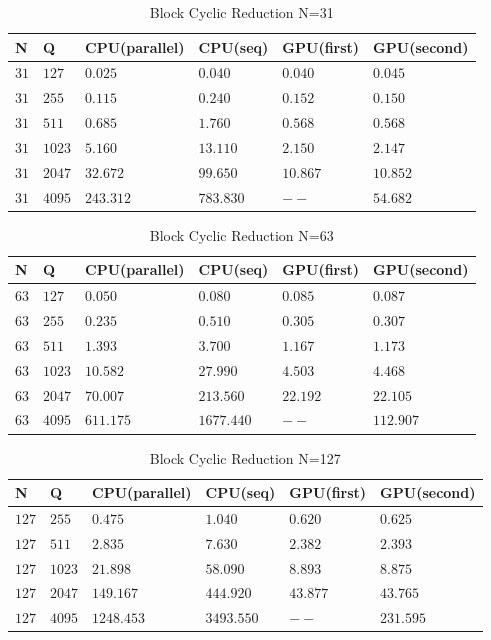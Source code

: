    \begin{table}[H]
\caption{Block Cyclic Reduction N=31} 
\centering 
\begin{tabular}{| l |  p{1cm} |p{}| p{} |  p{}| p{} | } 
\hline\hline 
N & Q & CPU(parallel) & CPU(seq) & GPU(first)  & GPU(second) \\ [0.8ex] 
\hline
$31$ &	$127$ & $0.025$	&	$0.040$ & $0.040$ & $0.045$ \\
$31$ &	$255$ & $0.115$	&	$0.240$ & $0.152$ & $0.150$ \\
$31$ &	$511$ & $0.685$	&	$1.760$ & $0.568$ & $0.568$ \\
$31$ &	$1023$ & $5.160$	& $13.110$ & $2.150$ & $2.147$ \\
$31$ &	$2047$ & $32.672$	& $99.650$  & $10.867$ & $10.852$ \\
$31$ &	$4095$ & $243.312$	& $783.830$ & $--$ & $54.682$ \\ [1ex]
\hline 
\end{tabular}
\label{table:bcr_n=31} 
\end{table}

   \begin{table}[H]
\caption{Block Cyclic Reduction N=63} 
\centering 
\begin{tabular}{| l |  p{1cm} |p{}| p{} |  p{}| p{} |} 
\hline\hline 
N & Q & CPU(parallel) & CPU(seq) & GPU(first)  & GPU(second)\\ [0.8ex] 
\hline

$63$ &	$127$ & $0.050$	&	$0.080$ & $0.085$ & $0.087$ \\
$63$ &	$255$ & $0.235$	&	$0.510$ & $0.305$ & $0.307$ \\
$63$ &	$511$ & $1.393$	&	$3.700$ & $1.167$ & $1.173$\\
$63$ &	$1023$ & $10.582$	& $27.990$ & $4.503$ & $4.468$ \\
$63$ &	$2047$ & $70.007$	& $213.560$ & $22.192$ & $22.105$ \\
$63$ &	$4095$ & $611.175$	& $1677.440$ & $--$ & $112.907$ \\[1ex]
\hline 
\end{tabular}
\label{table:bcr_n=63} 
\end{table}

   \begin{table}[H]
\caption{Block Cyclic Reduction N=127} 
\centering 
\begin{tabular}{| l |  p{1cm} |p{}| p{} |  p{}| p{} | } 
\hline\hline 
N & Q & CPU(parallel) & CPU(seq) & GPU(first)  & GPU(second) \\ [0.8ex] 
\hline
$127$ &	$255$ & $0.475$	&	$1.040$ &	$0.620$ & $0.625$ \\
$127$ &	$511$ & $2.835$	&	$7.630$ & 	$2.382$ & $2.393$ \\
$127$ &	$1023$ & $21.898$	& $58.090$ & 	$8.893$ & $8.875$ \\
$127$ &	$2047$ & $149.167$	& $444.920$ & 	$43.877$ & $43.765$ \\
$127$ &	$4095$ & $1248.453$	& $3493.550$ & 	$--$ & $231.595$ \\[1ex]
\hline 
\end{tabular}
\label{table:bcr_n=127} 
\end{table}

